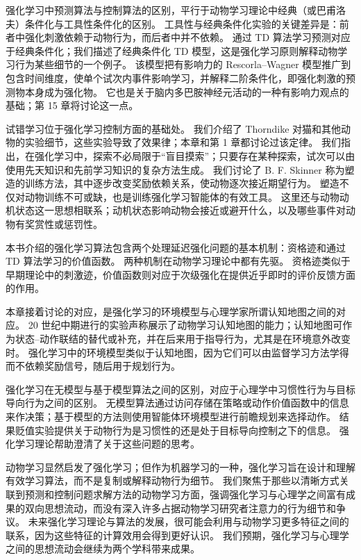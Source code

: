 \documentclass[UTF8,12pt,a4paper,fontset=fandol]{ctexart}
\begin{document}
强化学习中预测算法与控制算法的区别，平行于动物学习理论中经典（或巴甫洛夫）条件化与工具性条件化的区别。
工具性与经典条件化实验的关键差异是：前者中强化刺激依赖于动物行为，而后者中并不依赖。
通过 TD 算法学习预测对应于经典条件化；我们描述了经典条件化 TD 模型，这是强化学习原则解释动物学习行为某些细节的一个例子。
该模型把有影响力的 Rescorla--Wagner 模型推广到包含时间维度，使单个试次内事件影响学习，并解释二阶条件化，即强化刺激的预测物本身成为强化物。
它也是关于脑内多巴胺神经元活动的一种有影响力观点的基础；第 15 章将讨论这一点。

试错学习位于强化学习控制方面的基础处。
我们介绍了 Thorndike 对猫和其他动物的实验细节，这些实验导致了效果律；本章和第 1 章都讨论过该定律。
我们指出，在强化学习中，探索不必局限于“盲目摸索”；只要存在某种探索，试次可以由使用先天知识和先前学习知识的复杂方法生成。
我们讨论了 B. F. Skinner 称为塑造的训练方法，其中逐步改变奖励依赖关系，使动物逐次接近期望行为。
塑造不仅对动物训练不可或缺，也是训练强化学习智能体的有效工具。
这里还与动物动机状态这一思想相联系；动机状态影响动物会接近或避开什么，以及哪些事件对动物有奖赏性或惩罚性。

本书介绍的强化学习算法包含两个处理延迟强化问题的基本机制：资格迹和通过 TD 算法学习的价值函数。
两种机制在动物学习理论中都有先驱。
资格迹类似于早期理论中的刺激迹，价值函数则对应于次级强化在提供近乎即时的评价反馈方面的作用。

本章接着讨论的对应，是强化学习的环境模型与心理学家所谓认知地图之间的对应。
20 世纪中期进行的实验声称展示了动物学习认知地图的能力；认知地图可作为状态--动作联结的替代或补充，并在后来用于指导行为，尤其是在环境意外改变时。
强化学习中的环境模型类似于认知地图，因为它们可以由监督学习方法学得而不依赖奖励信号，随后用于规划行为。

强化学习在无模型与基于模型算法之间的区别，对应于心理学中习惯性行为与目标导向行为之间的区别。
无模型算法通过访问存储在策略或动作价值函数中的信息来作决策；基于模型的方法则使用智能体环境模型进行前瞻规划来选择动作。
结果贬值实验提供关于动物行为是习惯性的还是处于目标导向控制之下的信息。
强化学习理论帮助澄清了关于这些问题的思考。

动物学习显然启发了强化学习；但作为机器学习的一种，强化学习旨在设计和理解有效学习算法，而不是复制或解释动物行为细节。
我们聚焦于那些以清晰方式关联到预测和控制问题求解方法的动物学习方面，强调强化学习与心理学之间富有成果的双向思想流动，而没有深入许多占据动物学习研究者注意力的行为细节和争议。
未来强化学习理论与算法的发展，很可能会利用与动物学习更多特征之间的联系，因为这些特征的计算效用会得到更好认识。
我们预期，强化学习与心理学之间的思想流动会继续为两个学科带来成果。
\end{document}
